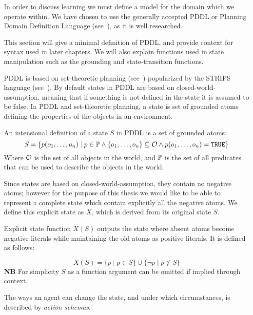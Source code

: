 \documentclass[../Master.tex]{subfiles}
\begin{document}
In order to discuss learning we must define a model for the domain which we operate within. We have chosen to use the generally accepted PDDL or Planning Domain Definition Language (see~\cite{PDDL}), as it is well researched.

This section will give a minimal definition of PDDL, and provide context for syntax used in later chapters. We will also explain functions used in state manipulation such as the grounding and state-transition functions.


PDDL is based on set-theoretic planning (see~\cite{ghallab2004a}) popularized by the STRIPS language (see~\cite{STRIPS}). By default states in PDDL are based on closed-world-assumption, meaning that if something is not defined in the state it is assumed to be false. 
In PDDL and set-theoretic planning, a state is set of grounded atoms defining the properties of the objects in an environment.

\begin{definition} 
	An intensional definition of a state $S$ in PDDL is a set of grounded atoms:
    \begin{equation*}
        S=\{p(o_1,\dots,o_n) \mid  p \in \mathbb{P} \land \{o_1,\dots,o_n\} \subseteq \mathcal{O} \land p(o_1,\dots,o_n) = \texttt{TRUE}\}
    \end{equation*}
    Where $\mathcal{O}$ is the set of all objects in the world, and $\mathbb{P}$ is the set of all predicates that can be used to describe the objects in the world.
\end{definition}

Since states are based on closed-world-assumption, they contain no negative atoms; however for the purpose of this thesis we would like to be able to represent a complete state which contain explicitly all the negative atoms. 
We define this explicit state as $X$, which is derived from its original state $S$.
\begin{definition} 
	Explicit state function $X(S)$ outputs the state where absent atoms become negative literals while maintaining the old atoms as positive literals. It is defined as follows: 
	
	\begin{equation*}
	X(S)=\{p \mid p \in S \} \cup \{\neg p \mid  p \notin S \}
	\end{equation*}
	\textbf{NB} For simplicity $S$ as a function argument can be omitted if implied through context. 
\end{definition}

The ways an agent can change the state, and under which circumstances, is described by \textit{action schemas}. 
	
\end{document}
